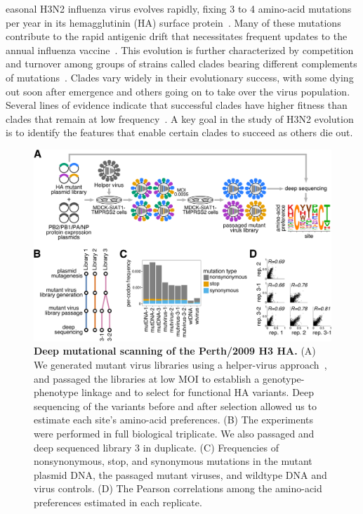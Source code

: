 \documentclass[9pt,twocolumn,twoside]{pnas-new-for-biorxiv}
\begin{document}
easonal H3N2 influenza virus evolves rapidly, fixing 3 to 4 amino-acid mutations per year in its hemagglutinin (HA) surface protein~\cite{fitch1997long, bhatt2011genomic}.
Many of these mutations contribute to the rapid antigenic drift that necessitates frequent updates to the annual influenza vaccine~\cite{smith2004mapping}.
This evolution is further characterized by competition and turnover among groups of strains called clades bearing different complements of mutations~\cite{bedford2011,strelkowa2012clonal,neher2014predicting,koelle2015effects,bedford2015global}.
Clades vary widely in their evolutionary success, with some dying out soon after emergence and others going on to take over the virus population.
Several lines of evidence indicate that successful clades have higher fitness than clades that remain at low frequency~\cite{bedford2011,strelkowa2012clonal,neher2014predicting,luksza2014predictive}.
A key goal in the study of H3N2 evolution is to identify the features that enable certain clades to succeed as others die out.

\begin{figure}
\centering
\includegraphics[width=12cm]{figs/dms_overview/dms_overview.pdf}
\caption{\label{fig:dms_overview}
{\bf Deep mutational scanning of the Perth/2009 H3 HA.}
(A) We generated mutant virus libraries using a helper-virus approach~\cite{doud2016accurate}, and passaged the libraries at low MOI to establish a genotype-phenotype linkage and to select for functional HA variants.
Deep sequencing of the variants before and after selection allowed us to estimate each site's amino-acid preferences.
(B) The experiments were performed in full biological triplicate.
We also passaged and deep sequenced library 3 in duplicate.
(C) Frequencies of nonsynonymous, stop, and synonymous mutations in the mutant plasmid DNA, the passaged mutant viruses, and wildtype DNA and virus controls.
(D) The Pearson correlations among the amino-acid preferences estimated in each replicate.
}
\end{figure}
\end{document}
